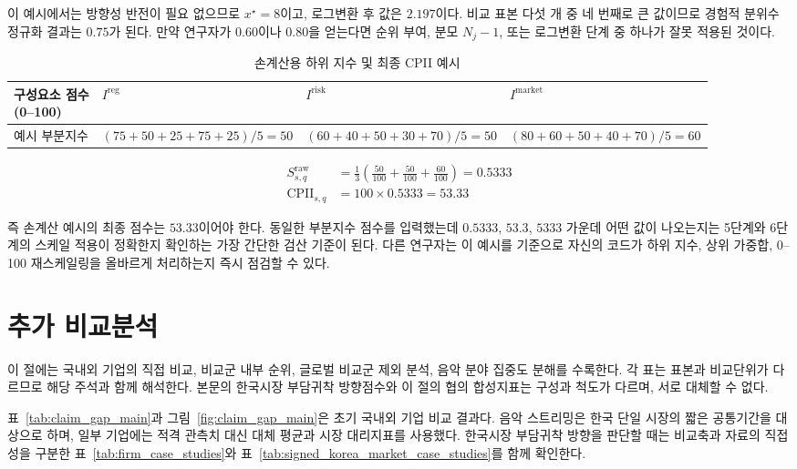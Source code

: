 \documentclass[11pt,a4paper]{report}
\newcommand{\WrapCell}[1]{\parbox[t]{\hsize}{\RaggedRight #1}}
\begin{document}
이 예시에서는 방향성 반전이 필요 없으므로 $x^{\star}=8$이고, 로그변환 후 값은 $2.197$이다. 비교 표본 다섯 개 중 네 번째로 큰 값이므로 경험적 분위수 정규화 결과는 $0.75$가 된다. 만약 연구자가 $0.60$이나 $0.80$을 얻는다면 순위 부여, 분모 $N_j-1$, 또는 로그변환 단계 중 하나가 잘못 적용된 것이다.

\begin{table}[H]
  \centering
  \small
  \caption{손계산용 하위 지수 및 최종 CPII 예시}\label{tab:cpii_handcheck_subindex}
  \begin{tabular}{L{3.0cm}L{2.4cm}L{2.4cm}L{2.4cm}}
    \toprule
    \WrapCell{구성요소 점수\\(0--100)} & $I^{\mathrm{reg}}$ & $I^{\mathrm{risk}}$ & $I^{\mathrm{market}}$ \\
    \midrule
    예시 부분지수 & $(75+50+25+75+25)/5=50$ & $(60+40+50+30+70)/5=50$ & $(80+60+50+40+70)/5=60$ \\
    \bottomrule
  \end{tabular}
\end{table}

\begin{align}
S^{\mathrm{raw}}_{s,q} &= \frac{1}{3}\left(\frac{50}{100}+\frac{50}{100}+\frac{60}{100}\right)=0.5333 \\
\mathrm{CPII}_{s,q} &= 100 \times 0.5333 = 53.33 \label{eq:cpii_handcheck_total}
\end{align}

즉 손계산 예시의 최종 점수는 $53.33$이어야 한다. 동일한 부분지수 점수를 입력했는데 $0.5333$, $53.3$, $5333$ 가운데 어떤 값이 나오는지는 5단계와 6단계의 스케일 적용이 정확한지 확인하는 가장 간단한 검산 기준이 된다. 다른 연구자는 이 예시를 기준으로 자신의 코드가 하위 지수, 상위 가중합, 0--100 재스케일링을 올바르게 처리하는지 즉시 점검할 수 있다.

\section{추가 비교분석}
이 절에는 국내외 기업의 직접 비교, 비교군 내부 순위, 글로벌 비교군 제외 분석, 음악 분야 집중도 분해를 수록한다. 각 표는 표본과 비교단위가 다르므로 해당 주석과 함께 해석한다. 본문의 한국시장 부담귀착 방향점수와 이 절의 협의 합성지표는 구성과 척도가 다르며, 서로 대체할 수 없다.

표~\ref{tab:claim_gap_main}과 그림~\ref{fig:claim_gap_main}은 초기 국내외 기업 비교 결과다. 음악 스트리밍은 한국 단일 시장의 짧은 공통기간을 대상으로 하며, 일부 기업에는 적격 관측치 대신 대체 평균과 시장 대리지표를 사용했다. 한국시장 부담귀착 방향을 판단할 때는 비교축과 자료의 직접성을 구분한 표~\ref{tab:firm_case_studies}와 표~\ref{tab:signed_korea_market_case_studies}를 함께 확인한다.
\end{document}
